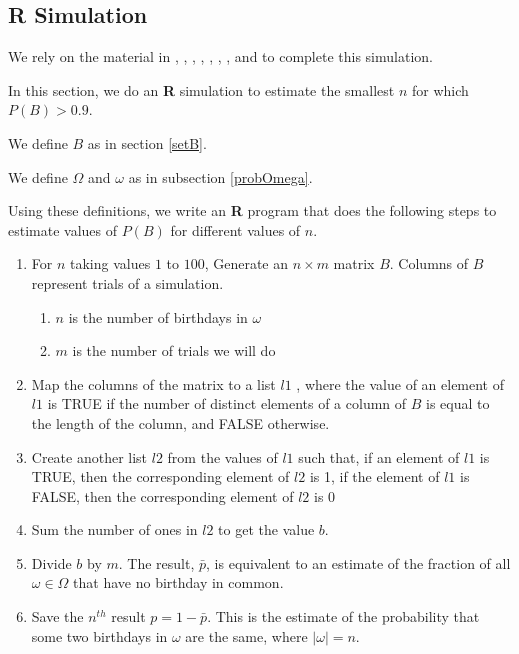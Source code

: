 \documentclass[a4paper,11pt]{article}
\begin{document}
\subsection{\textbf{\textsf{R}} Simulation}

We rely on the material in \cite{stackCheckEltsEq}, \cite{rtut1A},
\cite{rtut1B}, \cite{stackConvertBoolInt}, \cite{QuickR}, 
\cite{rmanualStatsRep}, \cite{rmanualStatsNrow},
and \cite{RDummies} to complete this simulation.

In this section, we do an \textbf{\textsf{R}} simulation to estimate the
smallest $n$ for which $P\left( B \right) > 0.9$.

We define $B$ as in section \ref{setB}.

We define $\Omega$ and $\omega$ as in subsection \ref{probOmega}.

Using these definitions, we write an \textbf{\textsf{R}} program that 
does the following steps to estimate values of $P\left(B \right)$
for different values of $n$.
\begin{enumerate}
 \item For $n$ taking values $1$ to $100$, Generate an $n \times m$
    matrix $B$.  Columns of $B$ represent trials of a simulation.
  \begin{enumerate}
    \item $n$ is the number of birthdays in $\omega$
    \item $m$ is the number of trials we will do 
  \end{enumerate}
  \item Map the columns of the matrix to a list $l1$ , where the value 
    of an element of $l1$ is TRUE if the number of distinct elements of 
    a column of $B$ is equal to the length of the column, and FALSE
    otherwise.
  \item Create another list $l2$ from the values of $l1$  such that, if
    an element of $l1$ is TRUE, then the corresponding element of $l2$ 
    is 1, if the element of $l1$ is FALSE, then the corresponding
    element of $l2$ is 0
  \item Sum the number of ones in $l2$ to get the value $b$.
  \item Divide $b$ by $m$. The result, $\bar{p}$, is equivalent to an
    estimate of the fraction of all $\omega \in \Omega$ 
    that have no birthday in common.
  \item Save the $n^{th}$ result $p=1-\bar{p}$.  This is the estimate of
   the probability that some two birthdays in $\omega$ are the same, 
   where $\left| \omega \right| = n$.
\end{enumerate}
\end{document}
